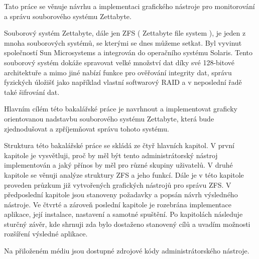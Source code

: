 
Tato práce se věnuje návrhu a implementaci grafického nástroje pro monitorování a správu souborového systému Zettabyte.

Souborový systém Zettabyte, dále jen ZFS ( Zettabyte file system ), je jeden z mnoha souborových systémů, se kterými se dnes můžeme setkat.
Byl vyvinut společností Sun Microsystems a integrován do operačního systému Solaris. Tento souborový systém dokáže spravovat velké množství dat
díky své 128-bitové architektuře a mimo jiné nabízí funkce pro ověřování integrity dat, správu fyzických úložišť jako například vlastní 
softwarový RAID a v neposlední řadě také šifrování dat.

Hlavním cílém této bakalářské práce je navrhnout a implementovat graficky orientovanou nadstavbu souborového systému Zettabyte, která bude zjednodušovat
a zpříjemňovat správu tohoto systému.

Struktura této bakalářské práce se skládá ze čtyř hlavních kapitol. V první kapitole je vysvětluji, proč by měl být tento administrátorský nástroj
implementován a jaký přínos by měl pro různé skupiny uživatelů. V druhé kapitole se věnuji analýze struktury ZFS a jeho funkcí. Dále je v této kapitole
proveden průzkum již vytvořených grafických nástrojů pro správu ZFS. V předposlední kapitole jsou stanoveny požadavky a popsán návrh výsledného nástroje.
Ve čtvrté a zároveň poslední kapitole je rozebrána implementace aplikace, její instalace, nastavení a samotné spuštění. Po kapitolách následuje sturčný 
závěr, kde shrnuji zda bylo dostaženo stanovený cílů a uvadím možnosti rozšíření výsledné aplikace.

Na přiloženém médiu jsou dostupné zdrojové kódy administrátorského nástroje.



